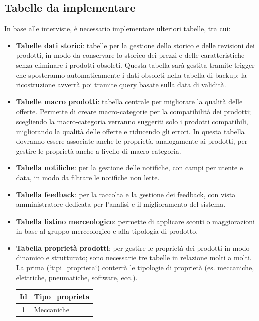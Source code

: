 \documentclass[12pt, a4paper]{article}
\begin{document}
\subsection{Tabelle da implementare}
In base alle interviste, è necessario implementare ulteriori tabelle, tra cui:
\begin{itemize}
    \item \textbf{Tabelle dati storici}: tabelle per la gestione dello storico e delle revisioni dei prodotti, in modo da conservare lo storico dei prezzi e delle caratteristiche senza eliminare i prodotti obsoleti.
          Questa tabella sarà gestita tramite trigger che sposteranno automaticamente i dati obsoleti nella tabella di backup; la ricostruzione avverrà poi tramite query basate sulla data di validità.
    \item \textbf{Tabelle macro prodotti}: tabella centrale per migliorare la qualità delle offerte.
          Permette di creare macro-categorie per la compatibilità dei prodotti; scegliendo la macro-categoria verranno suggeriti solo i prodotti compatibili, migliorando la qualità delle offerte e riducendo gli errori.
          In questa tabella dovranno essere associate anche le proprietà, analogamente ai prodotti, per gestire le proprietà anche a livello di macro-categoria.
    \item \textbf{Tabella notifiche}: per la gestione delle notifiche, con campi per utente e data, in modo da filtrare le notifiche non lette.
    \item \textbf{Tabella feedback}: per la raccolta e la gestione dei feedback, con vista amministratore dedicata per l'analisi e il miglioramento del sistema.
    \item \textbf{Tabella listino merceologico}: permette di applicare sconti o maggiorazioni in base al gruppo merceologico e alla tipologia di prodotto.
    \item \textbf{Tabella proprietà prodotti}: per gestire le proprietà dei prodotti in modo dinamico e strutturato; sono necessarie tre tabelle in relazione molti a molti.
          La prima (`tipi\_proprieta`) conterrà le tipologie di proprietà (es. meccaniche, elettriche, pneumatiche, software, ecc.).
          \begin{table}[h!]
              \centering
              \begin{tabular}{|c|l|}
                  \hline
                  \textbf{Id} & \textbf{Tipo\_proprieta} \\ \hline
                  1           & Meccaniche               \\ \hline

\end{tabular}
\end{table}
\end{itemize}
\end{document}
